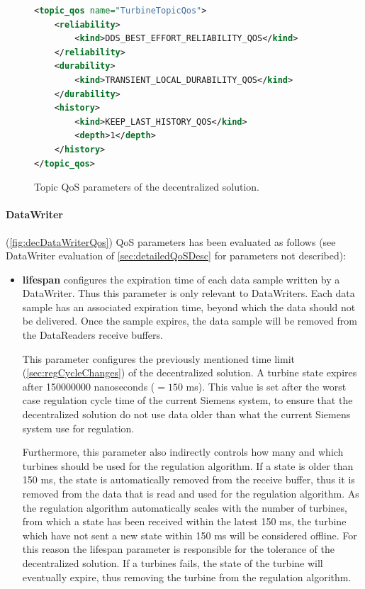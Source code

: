 \begin{figure}[!h]
\begin{lstlisting}[language=XML]
<topic_qos name="TurbineTopicQos">
	<reliability>
		<kind>DDS_BEST_EFFORT_RELIABILITY_QOS</kind>
	</reliability>
	<durability>
		<kind>TRANSIENT_LOCAL_DURABILITY_QOS</kind>
	</durability>
	<history>
		<kind>KEEP_LAST_HISTORY_QOS</kind>
		<depth>1</depth>
	</history>
</topic_qos>
\end{lstlisting}
\caption[Decentralized Topic QoS parameters]{
		\label{fig:decTopicQos} 
		\footnotesize{Topic QoS parameters of the decentralized solution.}
	}
\end{figure}

\paragraph{DataWriter} (\cref{fig:decDataWriterQos}) QoS parameters has been evaluated as follows (see DataWriter evaluation of \cref{sec:detailedQoSDesc} for parameters not described):

\begin{itemize}
	\item \textbf{lifespan} configures the expiration time of each data sample written by a DataWriter. Thus this parameter is only relevant to DataWriters. Each data sample has an associated expiration time, beyond which the data should not be delivered. Once the sample expires, the data sample will be removed from the DataReaders receive buffers. 
	
	This parameter configures the previously mentioned time limit (\cref{sec:regCycleChanges}) of the decentralized solution. A turbine state expires after 150000000 nanoseconds ($=150$ ms). This value is set after the worst case regulation cycle time of the current Siemens system, to ensure that the decentralized solution do not use data older than what the current Siemens system use for regulation.
	
	Furthermore, this parameter also indirectly controls how many and which turbines should be used for the regulation algorithm. If a state is older than 150 ms, the state is automatically removed from the receive buffer, thus it is removed from the data that is read and used for the regulation algorithm. As the regulation algorithm automatically scales with the number of turbines, from which a state has been received within the latest 150 ms, the turbine which have not sent a new state within 150 ms will be considered offline. For this reason the lifespan parameter is responsible for the tolerance of the decentralized solution. If a turbines fails, the state of the turbine will eventually expire, thus removing the turbine from the regulation algorithm.
\end{itemize}

